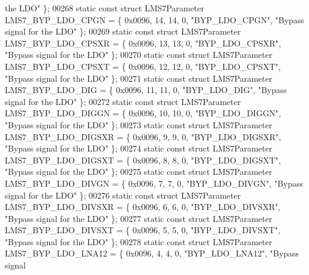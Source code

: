 \begin{DoxyCode}
{       the LDO"} \};
00268 \textcolor{keyword}{static} \textcolor{keyword}{const} \textcolor{keyword}{struct }LMS7Parameter LMS7_BYP_LDO_CPGN = \{ 0x0096, 14, 14, 0, \textcolor{stringliteral}{"BYP\_LDO\_CPGN"}, \textcolor{stringliteral}{"Bypass signal
       for the LDO"} \};
00269 \textcolor{keyword}{static} \textcolor{keyword}{const} \textcolor{keyword}{struct }LMS7Parameter LMS7_BYP_LDO_CPSXR = \{ 0x0096, 13, 13, 0, \textcolor{stringliteral}{"BYP\_LDO\_CPSXR"}, \textcolor{stringliteral}{"Bypass signal
       for the LDO"} \};
00270 \textcolor{keyword}{static} \textcolor{keyword}{const} \textcolor{keyword}{struct }LMS7Parameter LMS7_BYP_LDO_CPSXT = \{ 0x0096, 12, 12, 0, \textcolor{stringliteral}{"BYP\_LDO\_CPSXT"}, \textcolor{stringliteral}{"Bypass signal
       for the LDO"} \};
00271 \textcolor{keyword}{static} \textcolor{keyword}{const} \textcolor{keyword}{struct }LMS7Parameter LMS7_BYP_LDO_DIG = \{ 0x0096, 11, 11, 0, \textcolor{stringliteral}{"BYP\_LDO\_DIG"}, \textcolor{stringliteral}{"Bypass signal for
       the LDO"} \};
00272 \textcolor{keyword}{static} \textcolor{keyword}{const} \textcolor{keyword}{struct }LMS7Parameter LMS7_BYP_LDO_DIGGN = \{ 0x0096, 10, 10, 0, \textcolor{stringliteral}{"BYP\_LDO\_DIGGN"}, \textcolor{stringliteral}{"Bypass signal
       for the LDO"} \};
00273 \textcolor{keyword}{static} \textcolor{keyword}{const} \textcolor{keyword}{struct }LMS7Parameter LMS7_BYP_LDO_DIGSXR = \{ 0x0096, 9, 9, 0, \textcolor{stringliteral}{"BYP\_LDO\_DIGSXR"}, \textcolor{stringliteral}{"Bypass signal
       for the LDO"} \};
00274 \textcolor{keyword}{static} \textcolor{keyword}{const} \textcolor{keyword}{struct }LMS7Parameter LMS7_BYP_LDO_DIGSXT = \{ 0x0096, 8, 8, 0, \textcolor{stringliteral}{"BYP\_LDO\_DIGSXT"}, \textcolor{stringliteral}{"Bypass signal
       for the LDO"} \};
00275 \textcolor{keyword}{static} \textcolor{keyword}{const} \textcolor{keyword}{struct }LMS7Parameter LMS7_BYP_LDO_DIVGN = \{ 0x0096, 7, 7, 0, \textcolor{stringliteral}{"BYP\_LDO\_DIVGN"}, \textcolor{stringliteral}{"Bypass signal
       for the LDO"} \};
00276 \textcolor{keyword}{static} \textcolor{keyword}{const} \textcolor{keyword}{struct }LMS7Parameter LMS7_BYP_LDO_DIVSXR = \{ 0x0096, 6, 6, 0, \textcolor{stringliteral}{"BYP\_LDO\_DIVSXR"}, \textcolor{stringliteral}{"Bypass signal
       for the LDO"} \};
00277 \textcolor{keyword}{static} \textcolor{keyword}{const} \textcolor{keyword}{struct }LMS7Parameter LMS7_BYP_LDO_DIVSXT = \{ 0x0096, 5, 5, 0, \textcolor{stringliteral}{"BYP\_LDO\_DIVSXT"}, \textcolor{stringliteral}{"Bypass signal
       for the LDO"} \};
00278 \textcolor{keyword}{static} \textcolor{keyword}{const} \textcolor{keyword}{struct }LMS7Parameter LMS7_BYP_LDO_LNA12 = \{ 0x0096, 4, 4, 0, \textcolor{stringliteral}{"BYP\_LDO\_LNA12"}, \textcolor{stringliteral}{"Bypass signal
}
\end{DoxyCode}
